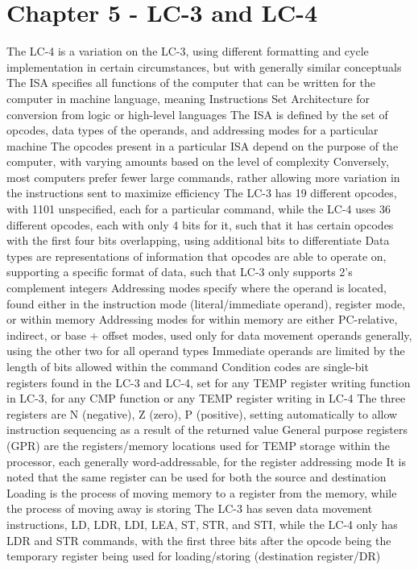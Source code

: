 \documentclass[11 pt, twoside]{article}
\newenvironment{outline*}
{
	\begin{outline}[enumerate]
	}
	{\end{outline}
}
\begin{document}
\section{Chapter 5 - LC-3 and LC-4}
\begin{outline*}
\1 The LC-4 is a variation on the LC-3, using different formatting and cycle implementation in certain circumstances, but with generally similar conceptuals
\1 The ISA specifies all functions of the computer that can be written for the computer in machine language, meaning Instructions Set Architecture for conversion from logic or high-level languages
\2 The ISA is defined by the set of opcodes, data types of the operands, and addressing modes for a particular machine
\1 The opcodes present in a particular ISA depend on the purpose of the computer, with varying amounts based on the level of complexity
\2 Conversely, most computers prefer fewer large commands, rather allowing more variation in the instructions sent to maximize efficiency
\2 The LC-3 has 19 different opcodes, with 1101 unspecified, each for a particular command, while the LC-4 uses 36 different opcodes, each with only 4 bits for it, such that it has certain opcodes with the first four bits overlapping, using additional bits to differentiate
\1 Data types are representations of information that opcodes are able to operate on, supporting a specific format of data, such that LC-3 only supports 2's complement integers
\1 Addressing modes specify where the operand is located, found either in the instruction mode (literal/immediate operand), register mode, or within memory
\2 Addressing modes for within memory are either PC-relative, indirect, or base + offset modes, used only for data movement operands generally, using the other two for all operand types
\2 Immediate operands are limited by the length of bits allowed within the command
\1 Condition codes are single-bit registers found in the LC-3 and LC-4, set for any TEMP register writing function in LC-3, for any CMP function or any TEMP register writing in LC-4
\2 The three registers are N (negative), Z (zero), P (positive), setting automatically to allow instruction sequencing as a result of the returned value
\1 General purpose registers (GPR) are the registers/memory locations used for TEMP storage within the processor, each generally word-addressable, for the register addressing mode
\2 It is noted that the same register can be used for both the source and destination
\2 Loading is the process of moving memory to a register from the memory, while the process of moving away is storing
\2 The LC-3 has seven data movement instructions, LD, LDR, LDI, LEA, ST, STR, and STI, while the LC-4 only has LDR and STR commands, with the first three bits after the opcode being the temporary register being used for loading/storing (destination register/DR)

\end{outline*}
\end{document}
